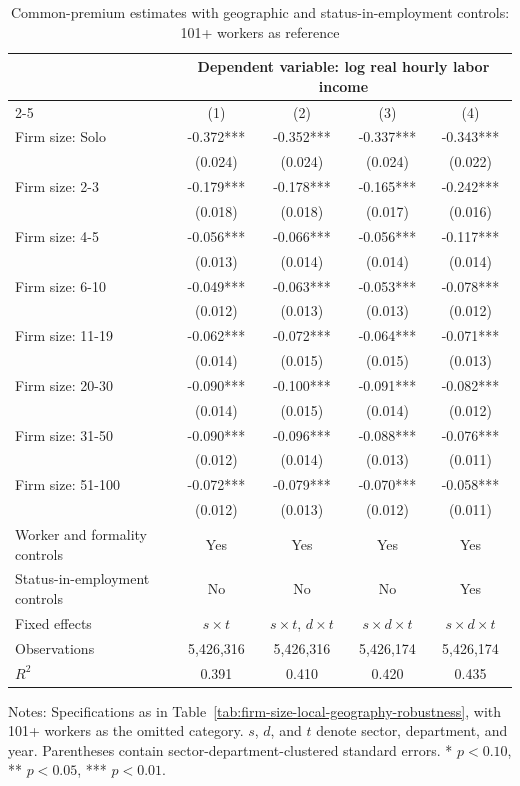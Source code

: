 \begin{table}[htbp]
  \centering
  \caption{Common-premium estimates with geographic and status-in-employment controls: 101+ workers as reference}
  \label{tab:firm-size-local-geography-robustness-101-reference}
  \small
  \begin{tabular}{lcccc}
    \toprule
    & \multicolumn{4}{c}{Dependent variable: log real hourly labor income} \\
    \cmidrule(lr){2-5}
    & (1) & (2) & (3) & (4) \\
    \midrule
    Firm size: Solo & -0.372*** & -0.352*** & -0.337*** & -0.343*** \\
     & (0.024) & (0.024) & (0.024) & (0.022) \\
    Firm size: 2-3 & -0.179*** & -0.178*** & -0.165*** & -0.242*** \\
     & (0.018) & (0.018) & (0.017) & (0.016) \\
    Firm size: 4-5 & -0.056*** & -0.066*** & -0.056*** & -0.117*** \\
     & (0.013) & (0.014) & (0.014) & (0.014) \\
    Firm size: 6-10 & -0.049*** & -0.063*** & -0.053*** & -0.078*** \\
     & (0.012) & (0.013) & (0.013) & (0.012) \\
    Firm size: 11-19 & -0.062*** & -0.072*** & -0.064*** & -0.071*** \\
     & (0.014) & (0.015) & (0.015) & (0.013) \\
    Firm size: 20-30 & -0.090*** & -0.100*** & -0.091*** & -0.082*** \\
     & (0.014) & (0.015) & (0.014) & (0.012) \\
    Firm size: 31-50 & -0.090*** & -0.096*** & -0.088*** & -0.076*** \\
     & (0.012) & (0.014) & (0.013) & (0.011) \\
    Firm size: 51-100 & -0.072*** & -0.079*** & -0.070*** & -0.058*** \\
     & (0.012) & (0.013) & (0.012) & (0.011) \\
    \midrule
    Worker and formality controls & Yes & Yes & Yes & Yes \\
    Status-in-employment controls & No & No & No & Yes \\
    Fixed effects & $s\times t$ & $s\times t$, $d\times t$ & $s\times d\times t$ & $s\times d\times t$ \\
    Observations & 5,426,316 & 5,426,316 & 5,426,174 & 5,426,174 \\
    $R^2$ & 0.391 & 0.410 & 0.420 & 0.435 \\
    \bottomrule
  \end{tabular}
  \vspace{0.3em}
  \begin{minipage}{0.95\textwidth}
  \footnotesize
  Notes: Specifications as in Table~\ref{tab:firm-size-local-geography-robustness}, with 101+ workers as the omitted category. $s$, $d$, and $t$ denote sector, department, and year. Parentheses contain sector-department-clustered standard errors. * $p<0.10$, ** $p<0.05$, *** $p<0.01$.
  \end{minipage}
\end{table}
